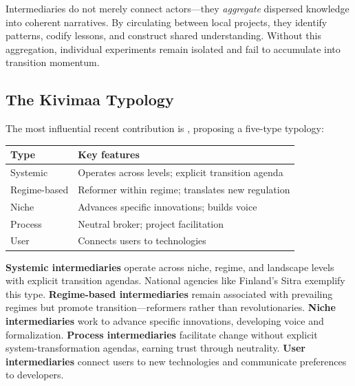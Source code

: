 \documentclass[../main.tex]{subfiles}
\begin{document}
\begin{insightbox}
Intermediaries do not merely connect actors---they \emph{aggregate} dispersed knowledge into coherent narratives. By circulating between local projects, they identify patterns, codify lessons, and construct shared understanding. Without this aggregation, individual experiments remain isolated and fail to accumulate into transition momentum.
\end{insightbox}

\subsection{The Kivimaa Typology}

The most influential recent contribution is \textcite{kivimaa2019innovation}, proposing a five-type typology:

\begin{margintable}
\centering
\caption{The Kivimaa intermediary typology}
\label{tab:background:kivimaa}
\scriptsize
\begin{tabular}{@{}p{1.4cm}p{2.6cm}@{}}
\toprule
\textbf{Type} & \textbf{Key features} \\
\midrule
Systemic & Operates across levels; explicit transition agenda \\
Regime-based & Reformer within regime; translates new regulation \\
Niche & Advances specific innovations; builds voice \\
Process & Neutral broker; project facilitation \\
User & Connects users to technologies \\
\bottomrule
\end{tabular}
\end{margintable}

\textbf{Systemic intermediaries} operate across niche, regime, and landscape levels with explicit transition agendas. National agencies like Finland's Sitra exemplify this type. \textbf{Regime-based intermediaries} remain associated with prevailing regimes but promote transition---reformers rather than revolutionaries. \textbf{Niche intermediaries} work to advance specific innovations, developing voice and formalization. \textbf{Process intermediaries} facilitate change without explicit system-transformation agendas, earning trust through neutrality. \textbf{User intermediaries} connect users to new technologies and communicate preferences to developers.
\end{document}
